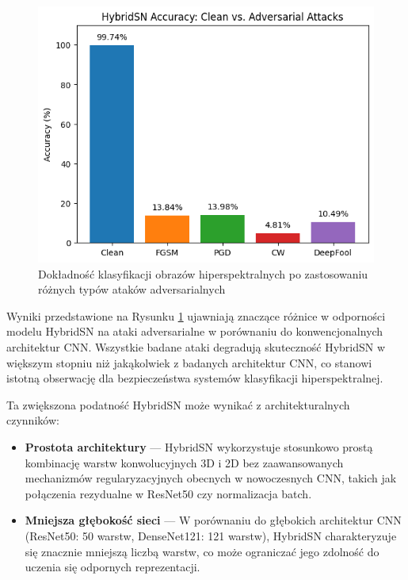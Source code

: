 \documentclass[12pt]{article}
\begin{document}
\begin{figure}[H]
    \centering
    \includegraphics[width=1\textwidth]{hybridsn_accuracy.png} 
    \caption{Dokładność klasyfikacji obrazów hiperspektralnych po zastosowaniu różnych typów ataków adversarialnych}
    \label{fig:hyperspectral-accuracy}
\end{figure}

Wyniki przedstawione na Rysunku \ref{fig:hyperspectral-accuracy} ujawniają znaczące różnice w odporności modelu HybridSN na ataki adversarialne w porównaniu do konwencjonalnych architektur CNN. Wszystkie badane ataki degradują skuteczność HybridSN w większym stopniu niż jakąkolwiek z badanych architektur CNN, co stanowi istotną obserwację dla bezpieczeństwa systemów klasyfikacji hiperspektralnej.

Ta zwiększona podatność HybridSN może wynikać z architekturalnych czynników:

\begin{itemize}
    \item \textbf{Prostota architektury} --- HybridSN wykorzystuje stosunkowo prostą kombinację warstw konwolucyjnych 3D i 2D bez zaawansowanych mechanizmów regularyzacyjnych obecnych w nowoczesnych CNN, takich jak połączenia rezydualne w ResNet50 czy normalizacja batch.
    
    \item \textbf{Mniejsza głębokość sieci} --- W porównaniu do głębokich architektur CNN (ResNet50: 50 warstw, DenseNet121: 121 warstw), HybridSN charakteryzuje się znacznie mniejszą liczbą warstw, co może ograniczać jego zdolność do uczenia się odpornych reprezentacji.
\end{itemize}
\end{document}
